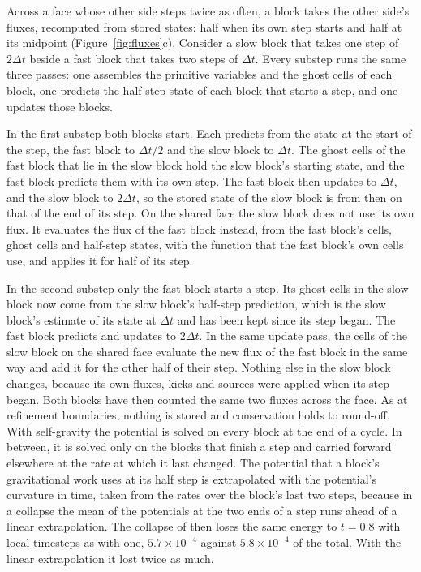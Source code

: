 \documentclass[twocolumn]{aastex701}
\begin{document}
Across a face whose other side steps twice as often, a block takes the other side's fluxes, recomputed from stored states: half when its own step starts and half at its midpoint (Figure~\ref{fig:fluxes}c). Consider a slow block that takes one step of $2\Delta t$ beside a fast block that takes two steps of $\Delta t$. Every substep runs the same three passes: one assembles the primitive variables and the ghost cells of each block, one predicts the half-step state of each block that starts a step, and one updates those blocks.

In the first substep both blocks start. Each predicts from the state at the start of the step, the fast block to $\Delta t/2$ and the slow block to $\Delta t$. The ghost cells of the fast block that lie in the slow block hold the slow block's starting state, and the fast block predicts them with its own step. The fast block then updates to $\Delta t$, and the slow block to $2\Delta t$, so the stored state of the slow block is from then on that of the end of its step. On the shared face the slow block does not use its own flux. It evaluates the flux of the fast block instead, from the fast block's cells, ghost cells and half-step states, with the function that the fast block's own cells use, and applies it for half of its step.

In the second substep only the fast block starts a step. Its ghost cells in the slow block now come from the slow block's half-step prediction, which is the slow block's estimate of its state at $\Delta t$ and has been kept since its step began. The fast block predicts and updates to $2\Delta t$. In the same update pass, the cells of the slow block on the shared face evaluate the new flux of the fast block in the same way and add it for the other half of their step. Nothing else in the slow block changes, because its own fluxes, kicks and sources were applied when its step began. Both blocks have then counted the same two fluxes across the face. As at refinement boundaries, nothing is stored and conservation holds to round-off. With self-gravity the potential is solved on every block at the end of a cycle. In between, it is solved only on the blocks that finish a step and carried forward elsewhere at the rate at which it last changed. The potential that a block's gravitational work uses at its half step is extrapolated with the potential's curvature in time, taken from the rates over the block's last two steps, because in a collapse the mean of the potentials at the two ends of a step runs ahead of a linear extrapolation. The collapse of \citet{Evrard1988} then loses the same energy to $t = 0.8$ with local timesteps as with one, $5.7\times10^{-4}$ against $5.8\times10^{-4}$ of the total. With the linear extrapolation it lost twice as much.
\end{document}
